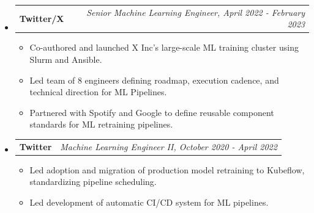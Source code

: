 \documentclass[letterpaper,10pt]{article}
\makeatletter
\newcommand{\resitem}[1]{\item #1 \vspace{-2pt}}
\newcommand{\ressubheading}[4]{
\begin{tabular*}{7.0in}{l@{\extracolsep{\fill}}r}
		\textbf{#1} & \textit{#4} \\
\end{tabular*}\vspace{-6pt}}
\makeatother
\begin{document}
\begin{itemize}
\begin{itemize}
				\resitem{Co-authored multi-model hosting endpoints reducing inference cost by 50\%.}
				\resitem{Co-authored Python SDK for automatic model deployment, reducing deploy times to hours instead of days.}
				\resitem{Designed self-hosted LLM serving gateway with OpenAI-compatible API and vLLM within Block.}
				\resitem{Presented in \href{https://www.youtube.com/watch?v=5WPrZgUu8u0}{industry conference} about scaling up Gondola, our unified ML model hosting at Block.}
			\end{itemize}
		\item
			\ressubheading{Twitter/X}{Boulder, CO}{Senior Machine Learning Engineer}{Senior Machine Learning Engineer, April 2022 - February 2023}
			\begin{itemize}
				\resitem{Co-authored and launched X Inc's large-scale ML training cluster using Slurm and Ansible.}
				\resitem{Led team of 8 engineers defining roadmap, execution cadence, and technical direction for ML Pipelines.} 
				\resitem{Partnered with Spotify and Google to define reusable component standards for ML retraining pipelines.}
			\end{itemize}
		\item
			\ressubheading{Twitter}{Boulder, CO}{Machine Learning Engineer II}{Machine Learning Engineer II, October 2020 - April 2022}
			\begin{itemize}
				\resitem{Led adoption and migration of production model retraining to Kubeflow, standardizing pipeline scheduling.}
				\resitem{Led development of automatic CI/CD system for ML pipelines.}

\end{itemize}
\end{itemize}
\end{document}
